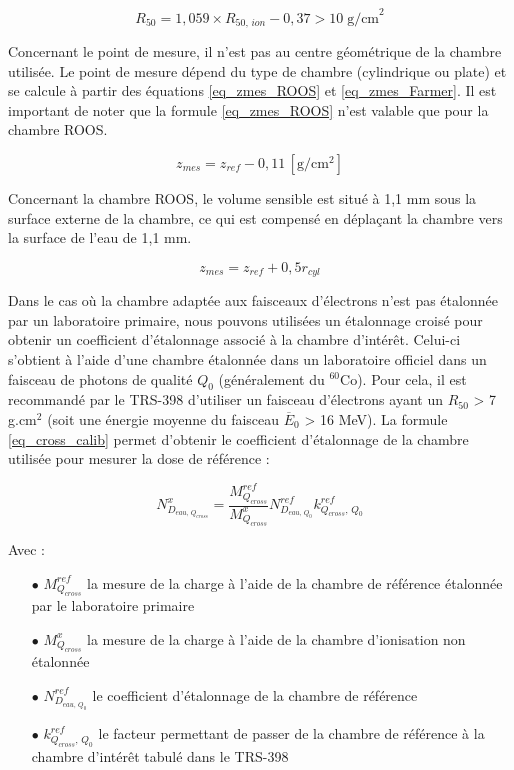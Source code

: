 \documentclass{article}
\begin{document}
\begin{equation}
  R_{50} = 1,059 \times R_{50,\, ion} - 0,37 > 10\; \text{g/cm}^2
\end{equation}

Concernant le point de mesure, il n'est pas au centre géométrique de la chambre utilisée. Le point de mesure dépend du type de chambre (cylindrique ou plate) et se calcule à partir des équations \ref*{eq_zmes_ROOS} et \ref*{eq_zmes_Farmer}. Il est important de noter que la formule \ref*{eq_zmes_ROOS} n'est valable que pour la chambre ROOS.

\begin{equation}
  z_{mes} = z_{ref} - 0,11 \, [\text{g/cm$^2$}]
  \label{eq_zmes_ROOS}
\end{equation}

Concernant la chambre ROOS, le volume sensible est situé à 1,1 mm sous la surface externe de la chambre, ce qui est compensé en déplaçant la chambre vers la surface de l'eau de 1,1 mm.

\begin{equation}
  z_{mes} = z_{ref} + 0,5 r_{cyl}
  \label{eq_zmes_Farmer}
\end{equation}

Dans le cas où la chambre adaptée aux faisceaux d'électrons n'est pas étalonnée par un laboratoire primaire, nous pouvons utilisées un étalonnage croisé pour obtenir un coefficient d'étalonnage associé à la chambre d'intérêt. Celui-ci s'obtient à l'aide d'une chambre étalonnée dans un laboratoire officiel dans un faisceau de photons de qualité $Q_0$ (généralement du $^{60}$Co). Pour cela, il est recommandé par le TRS-398 d'utiliser un faisceau d'électrons ayant un $R_{50}$ > 7 g.cm$^2$ (soit une énergie moyenne du faisceau $\overline{E}_0$ > 16 MeV). La formule \ref*{eq_cross_calib} permet d'obtenir le coefficient d'étalonnage de la chambre utilisée pour mesurer la dose de référence :

\begin{equation}
  N_{D_{eau, \, Q_{cross}}}^x = \dfrac{M_{Q_{cross}}^{ref}}{M_{Q_{cross}}^x} N_{D_{eau,\, Q_0}}^{ref} k_{Q_{cross},\, Q_0}^{ref}
  \label{eq_cross_calib}
\end{equation}

Avec :

\begin{itemize}
  \item[$\bullet$] $M_{Q_{cross}}^{ref}$ la mesure de la charge à l'aide de la chambre de référence étalonnée par le laboratoire primaire
  \item[$\bullet$] $M_{Q_{cross}}^x$ la mesure de la charge à l'aide de la chambre d'ionisation non étalonnée
  \item[$\bullet$] $N_{D_{eau,\, Q_0}}^{ref}$ le coefficient d'étalonnage de la chambre de référence
  \item[$\bullet$] $k_{Q_{cross},\, Q_0}^{ref}$ le facteur permettant de passer de la chambre de référence à la chambre d'intérêt tabulé dans le TRS-398
\end{itemize}
\end{document}
